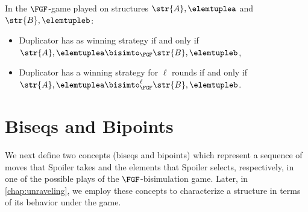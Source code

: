 \begin{corollary}
  In the $\FGF$-game played on structures $\str{A}, \elemtuplea$ and $\str{B}, \elemtupleb$:
  \begin{itemize}
    \item Duplicator has as winning strategy if and only if $\str{A}, \elemtuplea \bisimto_{\FGF} \str{B}, \elemtupleb$,
    \item Duplicator has a winning strategy for $\ell$ rounds if and only if $\str{A}, \elemtuplea \bisimto_{\FGF}^{\ell} \str{B}, \elemtupleb$.
  \end{itemize}
\end{corollary}

\section{Biseqs and Bipoints}\label{sec:biseqs-and-bipoints}
We next define two concepts (biseqs and bipoints) which represent a sequence of moves that Spoiler takes and the elements that Spoiler selects, respectively, in one of the possible plays of the $\FGF$-bisimulation game.
Later, in \cref{chap:unraveling}, we employ these concepts to characterize a structure in terms of its behavior under the game.

